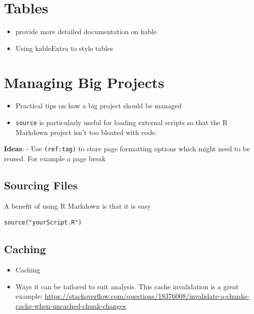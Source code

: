 \documentclass[]{book}
\providecommand{\tightlist}{%
  \setlength{\itemsep}{0pt}\setlength{\parskip}{0pt}}
\begin{document}
\chapter{Tables}\label{tables}

\begin{itemize}
\tightlist
\item
  provide more detailed documentation on kable
\item
  Using kableExtra to style tables
\end{itemize}

\chapter{Managing Big Projects}\label{managing-big-projects}

\begin{itemize}
\tightlist
\item
  Practical tips on how a big project should be managed
\item
  \texttt{source} is particularly useful for loading external scripts so
  that the R Markdown project isn't too bloated with code.
\end{itemize}

\textbf{Ideas}: - Use \texttt{(ref:tag)} to store page formatting
options which might need to be reused. For example a page break

\section{Sourcing Files}\label{sourcing-files}

A benefit of using R Markdown is that it is easy

\begin{verbatim}
source("yourScript.R")
\end{verbatim}

\section{Caching}\label{caching}

\begin{itemize}
\tightlist
\item
  Caching
\item
  Ways it can be tailored to suit analysis. This cache invalidation is a
  great example:
  \url{https://stackoverflow.com/questions/18376008/invalidate-a-chunks-cache-when-uncached-chunk-changes}
\end{itemize}
\end{document}
